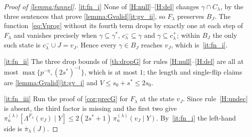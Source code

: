 \begin{proof}[Proof of \cref{lemma:funnel}]
    \ref{it:fn_i} None of \ref{H:null}--\ref{H:del} changes
    $\gamma\cap C_\lambda$, by the three sentences that prove
    \cref{lemma:Gvalid}\ref{it:gv_ii}, so $F_\lambda$ preserves $B_J$.
    The function~\eqref{eq:Vprog} without its fourth term drops by
    exactly one at each step of $F_\lambda$ and vanishes precisely when
    $\gamma\subseteq\gamma^{\ast}$, $c^{-}_\lambda\subseteq\gamma$ and
    $\gamma\subseteq c^{+}_\lambda$; within $B_J$ the only such state is
    $c^{-}_\lambda\cup J=v_J$. Hence every $\gamma\in B_J$ reaches $v_J$,
    which is~\ref{it:fn_i}.

    \ref{it:fn_ii} The three drop bounds of \cref{th:dropG} for rules
    \ref{H:null}--\ref{H:del} are all at most
    $\max\{p^{-\eta},(2s^{\ast})^{-1}\}$, which is at most $1$; the
    length and single-flip claims are
    \cref{lemma:Gvalid}\ref{it:gv_i} and $V\leq s_0+s^{\ast}\leq2s_0$.

    \ref{it:fn_iii} Run the proof of \cref{cor:precG} for $F_\lambda$ at
    the state $v_J$. Since rule~\ref{H:undec} is absent, the third factor
    is missing and the first two give
    $\pi_n^{(\lambda)}[\Lambda^{F_\lambda}(v_J)\mid Y]\leq
    2(2s^{\ast}+1)\,\pi_n^{(\lambda)}(v_J\mid Y)$. By~\ref{it:fn_i} the
    left-hand side is $\bar\pi_\lambda(J)$.
\end{proof}

